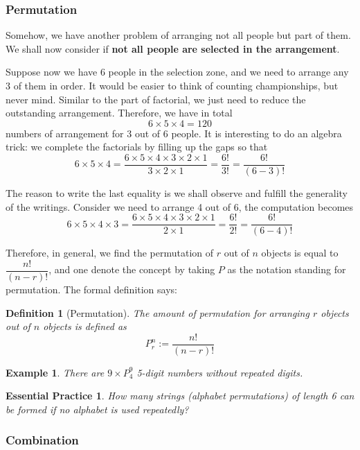 \documentclass[12pt]{article}
\newtheorem{definition}{Definition}[section]
\newtheorem*{example}{Example}
\newtheorem{exercise}{Essential Practice}[subsection]
\begin{document}
    \subsubsection*{Permutation}

    Somehow, we have another problem of arranging not all people but part of them. We shall now consider if \textbf{not all people are selected in the arrangement}.

    Suppose now we have 6 people in the selection zone, and we need to arrange any 3 of them in order. It would be easier to think of counting championships, but never mind. Similar to the part of factorial, we just need to reduce the outstanding arrangement. Therefore, we have in total $$6\times 5 \times 4 = 120$$ numbers of arrangement for 3 out of 6 people. It is interesting to do an algebra trick: we complete the factorials by filling up the gaps so that $$6\times 5 \times 4 = \frac{6\times 5\times 4\times 3\times 2\times 1}{3\times 2\times 1}=\frac{6!}{3!}=\frac{6!}{(6-3)!}$$

    The reason to write the last equality is we shall observe and fulfill the generality of the writings. Consider we need to arrange 4 out of 6, the computation becomes $$6\times 5 \times 4 \times 3= \frac{6\times 5\times 4\times 3\times 2\times 1}{2\times 1}=\frac{6!}{2!}=\frac{6!}{(6-4)!}$$

    Therefore, in general, we find the permutation of $r$ out of $n$ objects is equal to $\dfrac{n!}{(n-r)!}$, and one denote the concept by taking $P$ as the notation standing for permutation. The formal definition says:

    \begin{definition}[Permutation]
        The amount of permutation for arranging $r$ objects out of $n$ objects is defined as $$P_r^n:=\frac{n!}{(n-r)!}$$
    \end{definition}

    \begin{example}
        There are $9\times P_4^9$ 5-digit numbers without repeated digits.
    \end{example}

    \begin{exercise}
        How many strings (alphabet permutations) of length 6 can be formed if no alphabet is used repeatedly?
    \end{exercise}

    \subsubsection*{Combination}
\end{document}
